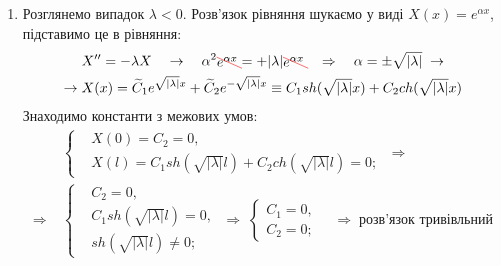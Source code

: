 \documentclass[a4paper, 14pt]{extreport}
\begin{document}
\begin{enumerate}
\begin{enumerate}
        \item Розглянемо випадок $\lambda < 0$. Розв'язок рівняння шукаємо у виді $X(x) = e^{\alpha x}$, підставимо це в рівняння: 
        \begin{equation*}
            \begin{aligned}
                &X^{\prime\prime} = -\lambda X
                \quad\to\quad
                \alpha^2 \textcolor{red}{\begin{xy}*{\textcolor{black}{e^{\alpha x}}};p+LU;+RD**h@{}+/\jot/**h@{-}\end{xy}} = +|\lambda| \textcolor{red}{\begin{xy}*{\textcolor{black}{e^{\alpha x}}};p+LU;+RD**h@{}+/\jot/**h@{-}\end{xy}}
                \quad\Rightarrow\quad
                \alpha = \pm \sqrt{|\lambda|}
                \;\to\\
                \to\;
                &X(x) = \widetilde{C}_1 e^{\sqrt{|\lambda|}x} + \widetilde{C}_2 e^{-\sqrt{|\lambda|}x} \equiv C_1 sh(\sqrt{|\lambda|}x) + C_2 ch({\sqrt{|\lambda|}x})
            \end{aligned}
        \end{equation*}
        Знаходимо константи з межових умов:
        \begin{equation*}
            \begin{aligned}
                &\left\{ \begin{aligned}
                    &X(0) = C_2 = 0, \\ 
                    &X(l) = C_1 sh(\sqrt{|\lambda|}l) + C_2 ch({\sqrt{|\lambda|}l}) = 0;
                \end{aligned} \right.
                \;\Rightarrow\\
                \Rightarrow\;
                &\left\{ \begin{aligned}
                    &C_2 = 0, \\ 
                    &C_1 sh(\sqrt{|\lambda|}l) = 0, \\
                    &sh(\sqrt{|\lambda|}l) \neq 0;
                \end{aligned} \right.
                \;\Rightarrow\;
                \left\{ \begin{aligned}
                    C_1 = 0, \\ 
                    C_2 = 0;
                \end{aligned} \right.
                \quad\Rightarrow\;
                \text{розв'язок тривівльний}
            \end{aligned}
        \end{equation*}
    

\end{enumerate}
\end{enumerate}
\end{document}
